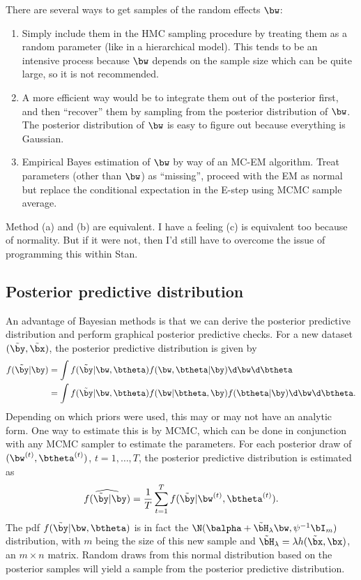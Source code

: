 \documentclass[english, 11pt]{article}
\begin{document}
There are several ways to get samples of the random effects $\bw$:
\begin{enumerate}
	\item Simply include them in the HMC sampling procedure by treating them as a random parameter (like in a hierarchical model). This tends to be an intensive process because $\bw$ depends on the sample size which can be quite large, so it is not recommended.
	\item A more efficient way would be to integrate them out of the posterior first, and then ``recover'' them by sampling from the posterior distribution of $\bw$. The posterior distribution of $\bw$ is easy to figure out because everything is Gaussian.
	\item Empirical Bayes estimation of $\bw$ by way of an MC-EM algorithm. Treat parameters (other than $\bw$) as ``missing'', proceed with the EM as normal but replace the conditional expectation in the E-step using MCMC sample average. 
\end{enumerate}
Method (a) and (b) are equivalent. I have a feeling (c) is equivalent too because of normality. But if it were not, then I’d still have to overcome the issue of programming this within Stan.



\subsection{Posterior predictive distribution}

An advantage of Bayesian methods is that we can derive the posterior predictive distribution and perform graphical posterior predictive checks.
For a new dataset $(\tilde\by, \tilde\bx)$, the posterior predictive distribution is given by
\begin{align*}
	f(\tilde\by | \by) &= \int f(\tilde\by | \bw, \btheta) f(\bw, \btheta | \by) \d\bw \d\btheta \\ 
	&= \int f(\tilde\by | \bw, \btheta) f(\bw | \btheta, \by) f(\btheta | \by) \d\bw \d\btheta.
\end{align*}
Depending on which priors were used, this may or may not have an analytic form. One way to estimate this is by MCMC, which can be done in conjunction with any MCMC sampler to estimate the parameters. For each posterior draw of $(\bw^{(t)}, \btheta^{(t)})$, $t=1,\dots,T$, the posterior predictive distribution is estimated as
\begin{align*}
	\widehat{f(\tilde\by | \by)} = \frac{1}{T} \sum_{t=1}^T f(\tilde\by | \bw^{(t)}, \btheta^{(t)}).
\end{align*}
The pdf $f(\tilde\by | \bw, \btheta)$ is in fact the $\N(\balpha + \tilde\bH_\lambda\bw, \psi^{-1}\bI_m)$ distribution, with $m$ being the size of this new sample and $\tilde\bH_\lambda = \lambda h(\tilde\bx, \bx)$, an $m \times n$ matrix. Random draws from this normal distribution based on the posterior samples will yield a sample from the posterior predictive distribution.
\end{document}
